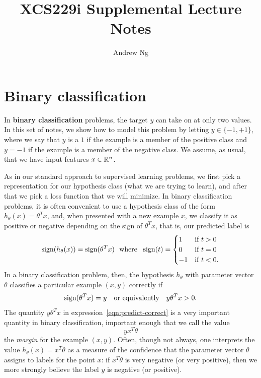 \documentclass{article}
\begin{document}
\title{XCS229i Supplemental Lecture Notes}
\author{Andrew Ng}
\date{}
\maketitle

\section{Binary classification}

In \textbf{binary classification} problems, the target $y$ can take on at
only two values. In this set of notes, we show how to model this problem by
letting $y \in \{-1, +1\}$, where we say that $y$ is a $1$ if the example is
a member of the positive class and $y = -1$ if the example is a member of
the negative class. We assume, as usual, that we have input features
$x \in \mathbb{R}^n$.

As in our standard approach to supervised learning problems, we first pick a
representation for our hypothesis class (what we are trying to learn), and
after that we pick a loss function that we will minimize.  In
binary classification problems, it is often convenient to use a hypothesis
class of the form $h_\theta(x) = \theta^T x$, and, when presented
with a new example $x$, we classify it as positive or negative
depending on the sign of $\theta^T x$, that is, our predicted
label is
\begin{equation*}
  \mathop{\rm sign}(h_\theta(x)) = \mathop{\rm sign}(\theta^T x)
  ~~ \mbox{where} ~~
  \mathop{\rm sign}(t) =
  \begin{cases} 1 & \mbox{if}~ t > 0 \\
    0 & \mbox{if~} t = 0 \\
    -1 & \mbox{if~} t < 0.
  \end{cases}
\end{equation*}
In a binary classification problem, then, the hypothesis $h_\theta$
with parameter vector $\theta$ classifies a particular example
$(x, y)$ correctly if
\begin{equation}
  \label{eqn:predict-correct}
  \mathop{\rm sign}(\theta^T x) = y
  ~~~ \mbox{or equivalently} ~~~
  y \theta^T x > 0.
\end{equation}
The quantity $y \theta^T x$ in expression~\eqref{eqn:predict-correct} is a
very important quantity in binary classification, important enough that we
call the value
\begin{equation*}
  y x^T \theta
\end{equation*}
the \emph{margin} for the example $(x, y)$. Often, though not always, one
interprets the value $h_\theta(x) = x^T \theta$ as a measure of the
confidence that the parameter vector $\theta$ assigns to labels for the
point $x$: if $x^T \theta$ is very negative (or very positive), then we more
strongly believe the label $y$ is negative (or positive).
\end{document}
